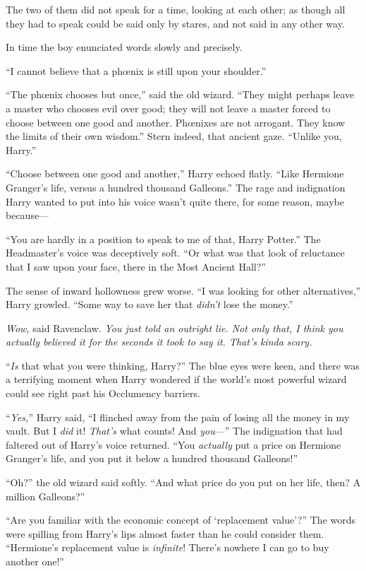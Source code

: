 The two of them did not speak for a time, looking at each other; as though all they had to speak could be said only by stares, and not said in any other way.

In time the boy enunciated words slowly and precisely.

“I cannot believe that a phœnix is still upon your shoulder.”

“The phœnix chooses but once,” said the old wizard. “They might perhaps leave a master who chooses evil over good; they will not leave a master forced to choose between one good and another. Phœnixes are not arrogant. They know the limits of their own wisdom.” Stern indeed, that ancient gaze. “Unlike you, Harry.”

“Choose between one good and another,” Harry echoed flatly. “Like Hermione Granger’s life, versus a hundred thousand Galleons.” The rage and indignation Harry wanted to put into his voice wasn’t quite there, for some reason, maybe because—

“You are hardly in a position to speak to me of that, Harry Potter.” The Headmaster’s voice was deceptively soft. “Or what was that look of reluctance that I saw upon your face, there in the Most Ancient Hall?”

The sense of inward hollowness grew worse. “I was looking for other alternatives,” Harry growled. “Some way to save her that \emph{didn’t} lose the money.”

\emph{Wow,} said Ravenclaw. \emph{You just told an outright lie. Not only that, I think you actually \emph{believed} it for the seconds it took to say it. That’s kinda scary.}

“\emph{Is} that what you were thinking, Harry?” The blue eyes were keen, and there was a terrifying moment when Harry wondered if the world’s most powerful wizard could see right past his Occlumency barriers.

“\emph{Yes,}” Harry said, “I flinched away from the pain of losing all the money in my vault. But I \emph{did} it! \emph{That’s} what counts! And \emph{you}—” The indignation that had faltered out of Harry’s voice returned. “You \emph{actually} put a price on Hermione Granger’s life, and you put it below a hundred thousand Galleons!”

“Oh?” the old wizard said softly. “And what price do you put on her life, then? A million Galleons?”

“Are you familiar with the economic concept of ‘replacement value’?” The words were spilling from Harry’s lips almost faster than he could consider them. “Hermione’s replacement value is \emph{infinite}! There’s nowhere I can go to buy another one!”

